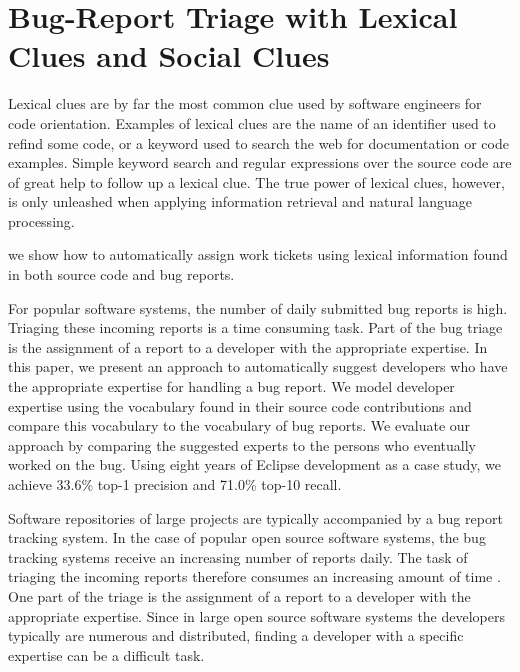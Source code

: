 \documentclass[10pt]{book}
\begin{document}

\chapter{Bug-Report Triage with Lexical Clues and Social Clues}
\label{the chapter on bug reports}

Lexical clues are by far the most common clue used by software engineers for code orientation. Examples of lexical clues are the name of an identifier used to refind some code, or a keyword used to search the web for documentation or code examples. Simple keyword search and regular expressions over the source code are of great help to follow up a lexical clue. The true power of lexical clues, however, is only unleashed when applying information retrieval and natural language processing. 

we show how to automatically assign work tickets using lexical information found in both source code and bug reports.



For popular software systems, the number of daily submitted bug reports is high. Triaging these incoming reports is a time consuming task. Part of the bug triage is the assignment of a report to a developer with the appropriate expertise. In this paper, we present an approach to automatically suggest developers who have the appropriate expertise for handling a bug report. We model developer expertise using the vocabulary found in their source code contributions and compare this vocabulary to the vocabulary of bug reports. We evaluate our approach by comparing the suggested experts to the persons who eventually worked on the bug. Using eight years of Eclipse development as a case study, we achieve 33.6\% top-1 precision and 71.0\% top-10 recall.

Software repositories of large projects are typically accompanied by a bug report tracking system. In the case of popular open source software systems, the bug tracking systems receive an increasing number of reports daily. The task of triaging the incoming reports therefore consumes an increasing amount of time \cite{Anvi06b}. One part of the triage is the assignment of a report to a developer with the appropriate expertise. Since in large open source software systems the developers typically are numerous and distributed, finding a developer with a specific expertise can be a difficult task.
\end{document}
